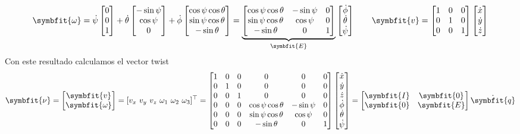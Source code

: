 \documentclass[11pt,a4paper]{article}
\numberwithin{equation}{section}
\newcommand{\vect}[1]{\symbfit{#1}}
\newcommand{\T}{^{\top}}
\begin{document}
{\small\[
\vect\omega = \dot\psi\begin{bmatrix}0\\0\\1\end{bmatrix} + \dot\theta\begin{bmatrix}-\sin\psi\\ \cos\psi\\ 0\end{bmatrix} + \dot\phi\begin{bmatrix}\cos\psi\cos\theta\\ \sin\psi\cos\theta\\ -\sin\theta\end{bmatrix}
= \underbrace{\begin{bmatrix}\cos\psi\cos\theta & -\sin\psi & 0\\ \sin\psi\cos\theta & \cos\psi & 0\\ -\sin\theta & 0 & 1\end{bmatrix}}_{\vect E}\begin{bmatrix}\dot\phi\\ \dot\theta\\ \dot\psi\end{bmatrix}
\qquad
\vect v = \begin{bmatrix}1 & 0 & 0\\ 0 & 1 & 0\\ 0 & 0 & 1\end{bmatrix}\begin{bmatrix}\dot x\\ \dot y\\ \dot z\end{bmatrix}
\]}
Con este resultado calculamos el vector twist
{\small\[
\vect\nu = \begin{bmatrix}\vect v\\ \vect\omega\end{bmatrix} = [v_x\ v_y\ v_z\ \omega_1\ \omega_2\ \omega_3]\T =
\begin{bmatrix}
1 & 0 & 0 & 0 & 0 & 0\\
0 & 1 & 0 & 0 & 0 & 0\\
0 & 0 & 1 & 0 & 0 & 0\\
0 & 0 & 0 & \cos\psi\cos\theta & -\sin\psi & 0\\
0 & 0 & 0 & \sin\psi\cos\theta & \cos\psi & 0\\
0 & 0 & 0 & -\sin\theta & 0 & 1
\end{bmatrix}
\begin{bmatrix}\dot x\\ \dot y\\ \dot z\\ \dot\phi\\ \dot\theta\\ \dot\psi\end{bmatrix}
= \begin{bmatrix}\vect I & \vect 0\\ \vect 0 & \vect E\end{bmatrix}\dot{\vect q}
\]}
\end{document}
